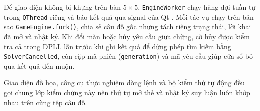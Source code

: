 Để giao diện không bị khựng trên bàn $5\times5$, \texttt{EngineWorker} chạy hàng đợi tuần tự trong \texttt{QThread} riêng và báo kết quả qua signal của Qt \cite{qtforpython6}. Mỗi tác vụ chạy trên bản sao \texttt{GameEngine.fork()}, chia sẻ câu đố gốc nhưng tách riêng trạng thái, lời khai đã mở và nhật ký. Khi đổi màn hoặc hủy yêu cầu giữa chừng, cờ hủy được kiểm tra cả trong DPLL lẫn trước khi ghi kết quả để dừng phép tìm kiếm bằng \texttt{SolverCancelled}, còn cặp mã phiên (\texttt{generation}) và mã yêu cầu giúp cửa sổ bỏ qua kết quả đến muộn.

Giao diện đồ họa, công cụ thực nghiệm dòng lệnh và bộ kiểm thử tự động đều gọi chung lớp kiểm chứng này nên thứ tự mở thẻ và nhật ký suy luận luôn khớp nhau trên cùng tệp câu đố.

